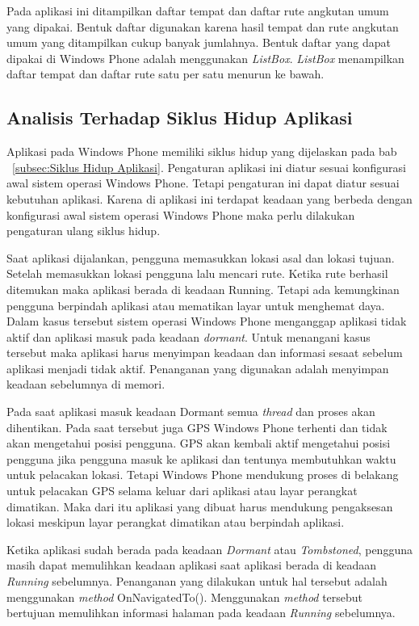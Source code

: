 Pada aplikasi ini ditampilkan daftar tempat dan daftar rute angkutan umum yang dipakai. Bentuk daftar digunakan karena hasil tempat dan rute angkutan umum yang ditampilkan cukup banyak jumlahnya. Bentuk daftar yang dapat dipakai di Windows Phone adalah menggunakan \textit{ListBox}. \textit{ListBox} menampilkan daftar tempat dan daftar rute satu per satu menurun ke bawah.

\subsection{Analisis Terhadap Siklus Hidup Aplikasi}
\label{lab:Analisis Terhadap Siklus Hidup Aplikasi}
\hspace{0.5cm} Aplikasi pada Windows Phone memiliki siklus hidup yang dijelaskan pada bab ~\ref{subsec:Siklus Hidup Aplikasi}. Pengaturan aplikasi ini diatur sesuai konfigurasi awal sistem operasi Windows Phone. Tetapi pengaturan ini dapat diatur sesuai kebutuhan aplikasi. Karena di aplikasi ini terdapat keadaan yang berbeda dengan konfigurasi awal sistem operasi Windows Phone maka perlu dilakukan pengaturan ulang siklus hidup.

Saat aplikasi dijalankan, pengguna memasukkan lokasi asal dan lokasi tujuan. Setelah memasukkan lokasi pengguna lalu mencari rute. Ketika rute berhasil ditemukan maka aplikasi berada di keadaan Running. Tetapi ada kemungkinan pengguna berpindah aplikasi atau mematikan layar untuk menghemat daya. Dalam kasus tersebut sistem operasi Windows Phone menganggap aplikasi tidak aktif dan aplikasi masuk pada keadaan \textit{dormant}. Untuk menangani kasus tersebut maka aplikasi harus menyimpan keadaan dan informasi sesaat sebelum aplikasi menjadi tidak aktif. Penanganan yang digunakan adalah menyimpan keadaan sebelumnya di memori.

Pada saat aplikasi masuk keadaan Dormant semua \textit{thread} dan proses akan dihentikan. Pada saat tersebut juga GPS Windows Phone terhenti dan tidak akan mengetahui posisi pengguna. GPS akan kembali aktif mengetahui posisi pengguna jika pengguna masuk ke aplikasi dan tentunya membutuhkan waktu untuk pelacakan lokasi. Tetapi Windows Phone mendukung proses di belakang untuk pelacakan GPS selama keluar dari aplikasi atau layar perangkat dimatikan. Maka dari itu aplikasi yang dibuat harus mendukung pengaksesan lokasi meskipun layar perangkat dimatikan atau berpindah aplikasi. 

Ketika aplikasi sudah berada pada keadaan \textit{Dormant} atau \textit{Tombstoned}, pengguna masih dapat memulihkan keadaan aplikasi saat aplikasi berada di keadaan \textit{Running} sebelumnya. Penanganan yang dilakukan untuk hal tersebut adalah menggunakan \textit{method} OnNavigatedTo(). Menggunakan \textit{method} tersebut bertujuan memulihkan informasi halaman pada keadaan \textit{Running} sebelumnya.

